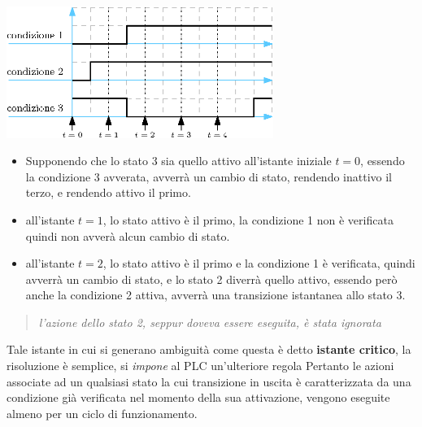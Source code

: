 \documentclass[10pt, letterpaper]{report}
\begin{document}
\begin{center}
    \includegraphics[width=0.65\textwidth ]{images/condizioni.eps}
\end{center}\begin{itemize}
    \item 
    Supponendo che lo stato 3 sia quello attivo all'istante iniziale $t=0$, essendo la condizione 3 avverata, avverrà un cambio di stato, rendendo inattivo il terzo, e rendendo attivo il primo.
    \item all'istante $t=1$, lo stato attivo è il primo, la condizione 1 non è verificata quindi non avverà alcun cambio di stato.
    \item all'istante $t=2$, lo stato attivo è il primo e la condizione 1 è verificata, quindi avverrà un cambio di stato, e lo stato 2 diverrà quello attivo, essendo però anche la condizione 2 attiva, avverrà una transizione istantanea allo stato 3. 
\end{itemize}
\begin{quotation}
    \textit{l'azione dello stato 2, seppur doveva essere eseguita, è stata ignorata}
\end{quotation}
Tale istante in cui si generano ambiguità come questa è detto \textbf{istante critico}, la risoluzione è semplice, si \textit{impone} al PLC un'ulteriore regola 
Pertanto le azioni associate ad un qualsiasi stato la cui transizione in uscita è
caratterizzata da una condizione già verificata nel momento della sua attivazione,
vengono eseguite almeno per un ciclo di funzionamento. 
\flowerLine
\end{document}
